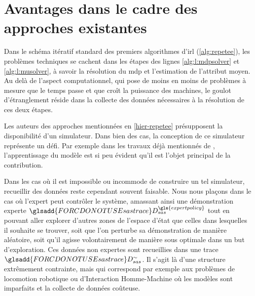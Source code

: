 \documentclass[frenchb,a4paper,justified,notoc]{tufte-book}
\newcommand{\expertpolicy}{\gls{expertpolicy}}
\newcommand{\sastrace}[1]{\ensuremath{\glsadd{FORCDONOTUSEsastrace}D_{sas}^{#1}}}
\begin{document}
\section{Avantages dans le cadre des approches existantes}
\label{sec-4-3}
\label{hier-lstdmuavantages}

   
   Dans le schéma itératif standard des premiers algorithmes d'\gls{irl} (\autoref{alg:repetee}), les problèmes techniques se cachent dans les étapes des lignes \ref{alg:l:mdpsolver} et \ref{alg:l:musolver}, à savoir la résolution du \gls{mdp} et l'estimation de l'attribut moyen. Au delà de l'aspect computationnel, qui pose de moins en moins de problèmes à mesure que le temps passe et que croît la puissance des machines, le goulot d'étranglement réside dans la collecte des données nécessaires à la résolution de ces deux étapes.

   Les auteurs des approches mentionnées en \autoref{hier-repetee} présupposent la disponibilité d'un simulateur. Dans bien des cas, la conception de ce simulateur représente un défi. Par exemple dans les travaux déjà mentionnés de \citet{abbeel2010autonomous}, l'apprentissage du modèle est si peu évident qu'il est l'objet principal de la contribution.

   Dans les cas où il est impossible ou incommode de construire un tel simulateur, recueillir des données reste cependant souvent faisable. Nous nous plaçons dans le cas où l'expert peut contrôler le système, amassant ainsi une démonstration experte $\sastrace{\expertpolicy}$ tout en pouvant aller explorer d'autres zones de l'espace d'état que celles dans lesquelles il souhaite se trouver, soit que l'on perturbe sa démonstration de manière aléatoire, soit qu'il agisse volontairement de manière sous optimale dans un but d'exploration. Ces données non expertes sont recueillies dans une trace $\sastrace{\sim}$. Il s'agit là d'une structure extrêmement contrainte, mais qui correspond par exemple aux problèmes de locomotion robotique ou d'Interaction Homme-Machine où les modèles sont imparfaits et la collecte de données coûteuse.
\end{document}
